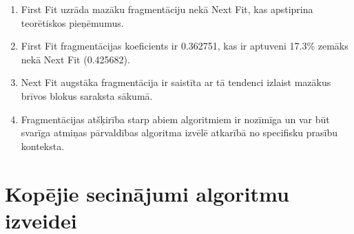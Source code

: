 \documentclass{report}
\begin{document}
	\begin{enumerate}
		\item First Fit uzrāda mazāku fragmentāciju nekā Next Fit, kas apstiprina teorētiskos pieņēmumus.
		
		\item First Fit fragmentācijas koeficients ir 0.362751, kas ir aptuveni 17.3\% zemāks nekā Next Fit (0.425682).
		
		\item Next Fit augstāka fragmentācija ir saistīta ar tā tendenci izlaist mazākus brīvos blokus saraksta sākumā.
		
		\item Fragmentācijas atšķirība starp abiem algoritmiem ir nozīmīga un var būt svarīga atmiņas pārvaldības algoritma izvēlē atkarībā no specifisku prasību konteksta.
	\end{enumerate}
	
	\section{Kopējie secinājumi algoritmu izveidei}
	
\end{document}
